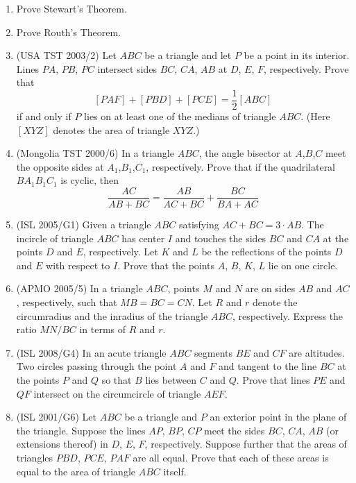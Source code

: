 \begin{enumerate}
  \item Prove Stewart's Theorem.

  \item Prove Routh's Theorem.

  \item (USA TST 2003/2) Let $ABC$ be a triangle and let $P$ be a point in its interior. Lines $PA$, $PB$, $PC$ intersect sides $BC$, $CA$, $AB$ at $D$, $E$, $F$, respectively. Prove that
\[ [PAF]+[PBD]+[PCE]=\frac{1}{2}[ABC]  \]
if and only if $P$ lies on at least one of the medians of triangle $ABC$. (Here $[XYZ]$ denotes the area of triangle $XYZ$.)

  \item (Mongolia TST 2000/6) In a triangle $ABC$, the angle bisector at $A$,$B$,$C$ meet the opposite sides at $A_1$,$B_1$,$C_1$, respectively. Prove that if the quadrilateral $BA_1B_1C_1$ is cyclic, then
  \[ \frac{AC}{AB+BC} = \frac{AB}{AC+BC} + \frac{BC}{BA+AC} \]

  \item (ISL 2005/G1) Given a triangle $ABC$ satisfying $AC+BC=3\cdot AB$. The incircle of triangle $ABC$ has center $I$ and touches the sides $BC$ and $CA$ at the points $D$ and $E$, respectively. Let $K$ and $L$ be the reflections of the points $D$ and $E$ with respect to $I$. Prove that the points $A$, $B$, $K$, $L$ lie on one circle.  

  \item (APMO 2005/5) In a triangle $ABC$, points $M$ and $N$ are on sides $AB$ and $AC$, respectively, such that $MB = BC = CN$. Let $R$ and $r$ denote the circumradius and the inradius of the triangle $ABC$, respectively. Express the ratio $MN/BC$ in terms of $R$ and $r$.  

  \item (ISL 2008/G4) In an acute triangle $ ABC$ segments $ BE$ and $ CF$ are altitudes. Two circles passing through the point $ A$ and $ F$ and tangent to the line $ BC$ at the points $ P$ and $ Q$ so that $ B$ lies between $ C$ and $ Q$. Prove that lines $ PE$ and $ QF$ intersect on the circumcircle of triangle $ AEF$.

  \item (ISL 2001/G6) Let $ABC$ be a triangle and $P$ an exterior point in the plane of the triangle. Suppose the lines $AP$, $BP$, $CP$ meet the sides $BC$, $CA$, $AB$ (or extensions thereof) in $D$, $E$, $F$, respectively. Suppose further that the areas of triangles $PBD$, $PCE$, $PAF$ are all equal. Prove that each of these areas is equal to the area of triangle $ABC$ itself.  


\end{enumerate}
